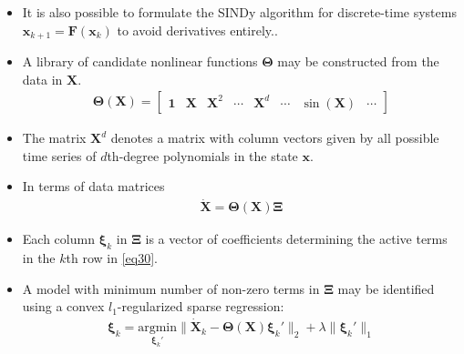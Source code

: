 \documentclass[hyperref={pdfpagemode=FullScreen},aspectratio=169]{beamer}
\begin{document}
\begin{frame}{}
\begin{itemize}
\setlength\itemsep{1em}
\item It is also possible to formulate the SINDy algorithm for discrete-time systems $\mathbf{x}_{k+1} = \mathbf{F}(\mathbf{x}_k)$ to avoid derivatives entirely..
\item A library of candidate nonlinear functions $\mathbf{\Theta}$ may be constructed from the data in $\mathbf{X}$.
\begin{align}
\mathbf{\Theta}(\mathbf{X}) = \begin{bmatrix} \mathbf{1} & \mathbf{X} & \mathbf{X}^2 & \cdots & \mathbf{X}^d & \cdots & \sin(\mathbf{X}) & \cdots \end{bmatrix}
\end{align}
\item The matrix $\mathbf{X}^d$ denotes a matrix with column vectors given by all possible time series
of $d$th-degree polynomials in the state $\mathbf{x}$.
\item In terms of data matrices
\begin{align}
\dot{\mathbf{X}} = \mathbf{\Theta}(\mathbf{X})\mathbf{\Xi}
\end{align}
\item Each column $\boldsymbol{\xi}_k$ in $\mathbf{\Xi}$ is a vector of coefficients determining the active terms in the $k$th row in \cref{eq30}.
\item A model with minimum number of non-zero terms in $\mathbf{\Xi}$ may be identified using a convex $l_1$-regularized sparse regression:
\begin{align}
\boldsymbol{\xi}_k = \underset{\boldsymbol{\xi}_k'}{\text{argmin}} \|\dot{\mathbf{X}}_k - \boldsymbol{\Theta}(\mathbf{X})\boldsymbol{\xi}_k'\|_2 + \lambda\|\boldsymbol{\xi}_k'\|_1
\end{align}
\end{itemize}
\end{frame}
\end{document}
